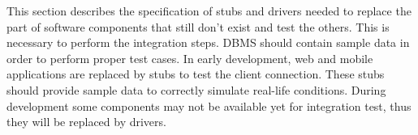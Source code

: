 This section describes the specification of stubs and drivers needed to replace the part of software components that still don't exist and test the others. This is necessary to perform the integration steps.
DBMS should contain sample data in order to perform proper test cases. 
In early development, web and mobile applications are replaced by stubs to test the client connection. These stubs should provide sample data to correctly simulate real-life conditions. 
During development some components may not be available yet for integration test, thus they will be replaced by drivers.